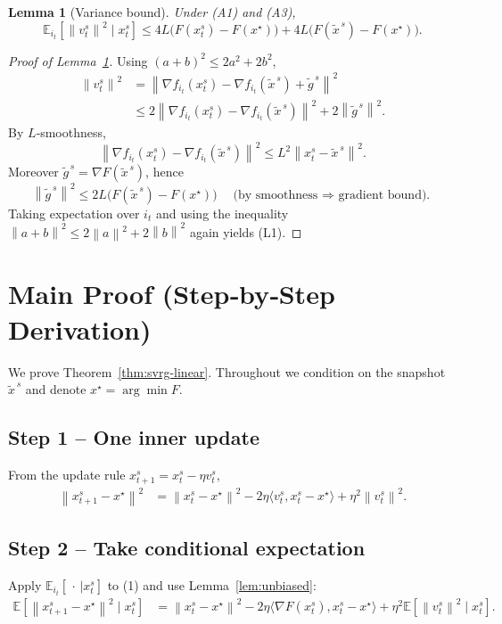 \documentclass{article}
\newtheorem{lemma}{Lemma}
\newcommand{\E}{\mathbb{E}}
\newcommand{\norm}[1]{\left\lVert #1\right\rVert}
\begin{document}
\begin{lemma}[Variance bound]\label{lem:variance-bound}
Under (A1) and (A3),
\[
\E_{i_t}\!\left[\norm{v_t^{s}}^{2}\mid x_{t}^{s}\right]
\le 4L\bigl(F(x_{t}^{s})-F(x^{\star})\bigr)
      +4L\bigl(F(\tilde{x}^{\,s})-F(x^{\star})\bigr).
\tag{L1}
\]
\end{lemma}
\begin{proof}[Proof of Lemma~\ref{lem:variance-bound}]
Using $(a+b)^{2}\le 2a^{2}+2b^{2}$,
\[
\begin{aligned}
\norm{v_t^{s}}^{2}
&=\norm{\nabla f_{i_t}(x_{t}^{s})-\nabla f_{i_t}(\tilde{x}^{\,s})+\tilde{g}^{\,s}}^{2}\\
&\le 2\norm{\nabla f_{i_t}(x_{t}^{s})-\nabla f_{i_t}(\tilde{x}^{\,s})}^{2}
   +2\norm{\tilde{g}^{\,s}}^{2}.
\end{aligned}
\]
By $L$‑smoothness,
\[
\norm{\nabla f_{i_t}(x_{t}^{s})-\nabla f_{i_t}(\tilde{x}^{\,s})}^{2}
\le L^{2}\norm{x_{t}^{s}-\tilde{x}^{\,s}}^{2}.
\]
Moreover $\tilde{g}^{\,s}=\nabla F(\tilde{x}^{\,s})$, hence
\[
\norm{\tilde{g}^{\,s}}^{2}\le 2L\bigl(F(\tilde{x}^{\,s})-F(x^{\star})\bigr) 
\quad\text{(by smoothness $\Rightarrow$ gradient bound).}
\]
Taking expectation over $i_t$ and using the inequality
$\norm{a+b}^{2}\le 2\norm{a}^{2}+2\norm{b}^{2}$ again yields (L1). \qedhere
\end{proof}

\section*{Main Proof (Step‑by‑Step Derivation)}
We prove Theorem~\ref{thm:svrg-linear}.  Throughout we condition on the snapshot $\tilde{x}^{\,s}$ and denote $x^{\star}= \arg\min F$.

\subsection*{Step 1 – One inner update}
From the update rule $x_{t+1}^{s}=x_{t}^{s}-\eta v_t^{s}$,
\[
\begin{aligned}
\norm{x_{t+1}^{s}-x^{\star}}^{2}
&= \norm{x_{t}^{s}-x^{\star}}^{2}
   -2\eta\langle v_t^{s},x_{t}^{s}-x^{\star}\rangle
   +\eta^{2}\norm{v_t^{s}}^{2}. \tag{1}
\end{aligned}
\]

\subsection*{Step 2 – Take conditional expectation}
Apply $\E_{i_t}[\,\cdot\,|x_{t}^{s}]$ to (1) and use Lemma~\ref{lem:unbiased}:
\[
\begin{aligned}
\E\!\left[\norm{x_{t+1}^{s}-x^{\star}}^{2}\mid x_{t}^{s}\right]
&= \norm{x_{t}^{s}-x^{\star}}^{2}
   -2\eta\langle \nabla F(x_{t}^{s}),x_{t}^{s}-x^{\star}\rangle
   +\eta^{2}\E\!\left[\norm{v_t^{s}}^{2}\mid x_{t}^{s}\right]. \tag{2}
\end{aligned}
\]
\end{document}
